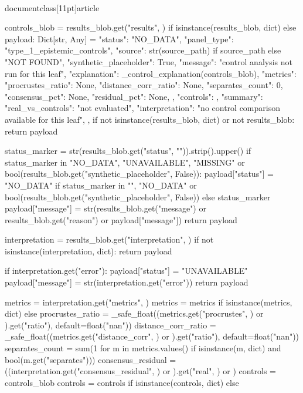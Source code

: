 \\documentclass[11pt]{article}
\begin{document}
\begin{CodeBlock}
    controls_blob = results_blob.get("results", {}) if isinstance(results_blob, dict) else {}
    payload: Dict[str, Any] = {
        "status": "NO_DATA",
        "panel_type": "type_1_epistemic_controls",
        "source": str(source_path) if source_path else "NOT FOUND",
        "synthetic_placeholder": True,
        "message": "control analysis not run for this leaf",
        "explanation": _control_explanation(controls_blob),
        "metrics": {
            "procrustes_ratio": None,
            "distance_corr_ratio": None,
            "separates_count": 0,
            "consensus_pct": None,
            "residual_pct": None,
        },
        "controls": {},
        "summary": {
            "real_vs_controls": "not evaluated",
            "interpretation": "no control comparison available for this leaf",
        },
    }
    if not isinstance(results_blob, dict) or not results_blob:
        return payload

    status_marker = str(results_blob.get("status", "")).strip().upper()
    if status_marker in {"NO_DATA", "UNAVAILABLE", "MISSING"} or bool(results_blob.get("synthetic_placeholder", False)):
        payload["status"] = "NO_DATA" if status_marker in {"", "NO_DATA"} or bool(results_blob.get("synthetic_placeholder", False)) else status_marker
        payload["message"] = str(results_blob.get("message") or results_blob.get("reason") or payload["message"])
        return payload

    interpretation = results_blob.get("interpretation", {})
    if not isinstance(interpretation, dict):
        return payload

    if interpretation.get("error"):
        payload["status"] = "UNAVAILABLE"
        payload["message"] = str(interpretation.get("error"))
        return payload

    metrics = interpretation.get("metrics", {})
    metrics = metrics if isinstance(metrics, dict) else {}
    procrustes_ratio = _safe_float((metrics.get("procrustes", {}) or {}).get("ratio"), default=float("nan"))
    distance_corr_ratio = _safe_float((metrics.get("distance_corr", {}) or {}).get("ratio"), default=float("nan"))
    separates_count = sum(1 for m in metrics.values() if isinstance(m, dict) and bool(m.get("separates")))
    consensus_residual = ((interpretation.get("consensus_residual", {}) or {}).get("real", {}) or {})
    controls = controls_blob
    controls = controls if isinstance(controls, dict) else {}


\end{CodeBlock}
\end{document}
